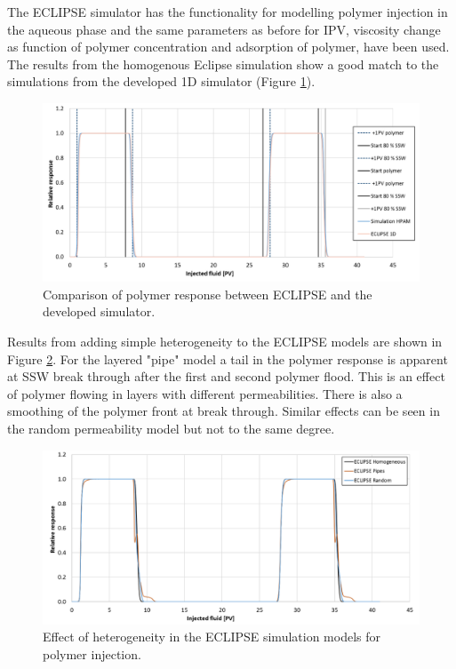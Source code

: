 \enlargethispage{2cm} %
The ECLIPSE simulator has the functionality for modelling polymer injection in the aqueous phase and the same parameters as before for IPV, viscosity change as function of polymer concentration and adsorption of polymer, have been used. The results from the homogenous Eclipse simulation show a good match to the simulations from the developed 1D simulator (Figure \ref{cht:simEcl}).

\begin{figure}
    \centering
    \includegraphics[width=\textwidth]{img/cht/simEcl.png}
    \caption{Comparison of polymer response between ECLIPSE and the developed simulator.}
    \label{cht:simEcl}
\end{figure}

\FloatBarrier

Results from adding simple heterogeneity to the ECLIPSE models are shown in Figure \ref{cht:simEclHet}. For the layered "pipe" model a tail in the polymer response is apparent at SSW break through after the first and second polymer flood. This is an effect of polymer flowing in layers with different permeabilities. There is also a smoothing of the polymer front at break through. Similar effects can be seen in the random permeability model but not to the same degree.    

\begin{figure}
    \centering
    \includegraphics[width=\textwidth]{img/cht/simEclHet.png}
    \caption{Effect of heterogeneity in the ECLIPSE simulation models for polymer injection.}
    \label{cht:simEclHet}
\end{figure}

